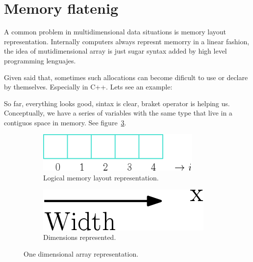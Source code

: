 \section{Memory flatenig}

A common problem in multidimensional data situations is memory layout representation. Internally computers always represnt memorry in a linear fashion, the idea of mutidimensional array is just sugar syntax added by high level programming lenguajes.

Given said that, sometimes such allocations can become dificult to use or declare by themselves. Especially in C++. Lets see an example:

{\centering
\begin{minipage}{\linewidth}
\end{minipage}
\par
}
\vspace{0.5cm}
So far, everything looks good, sintax is clear, braket operator is helping us. 
Conceptually, we have a series of variables with the same type that live in a contiguos space in memory. See figure~\ref{fig:1D}.

\begin{figure}[htp]
  \centering
  \begin{subfigure}[b]{0.35\textwidth}
    \includegraphics[width=\textwidth]{img/array1D}
    \caption{Logical memory layout representation.}
  \label{fig:1a}
  \end{subfigure}
  \hspace*{4cm}
  \begin{subfigure}[b]{0.25\textwidth}
    \includegraphics[width=\textwidth]{img/arrow1D}
    \caption{Dimensions represented.}
    \label{fig:1b}
  \end{subfigure}
  \caption{One dimensional array representation.}
  \label{fig:1D}
\end{figure}

